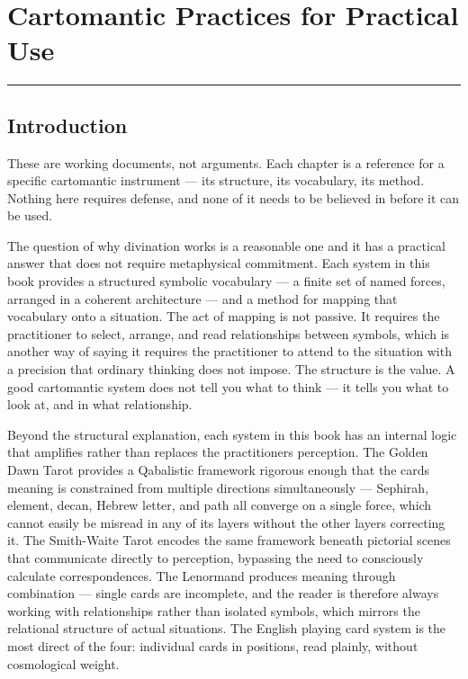 \chapter{Cartomantic Practices for Practical Use}\label{cartomantic-practices-for-practical-use}

\begin{center}\rule{0.5\linewidth}{0.5pt}\end{center}

\section{Introduction}\label{introduction}

These are working documents, not arguments. Each chapter is a reference for a specific cartomantic instrument --- its structure, its vocabulary, its method. Nothing here requires defense, and none of it needs to be believed in before it can be used.

The question of why divination works is a reasonable one and it has a practical answer that does not require metaphysical commitment. Each system in this book provides a structured symbolic vocabulary --- a finite set of named forces, arranged in a coherent architecture --- and a method for mapping that vocabulary onto a situation. The act of mapping is not passive. It requires the practitioner to select, arrange, and read relationships between symbols, which is another way of saying it requires the practitioner to attend to the situation with a precision that ordinary thinking does not impose. The structure is the value. A good cartomantic system does not tell you what to think --- it tells you what to look at, and in what relationship.

Beyond the structural explanation, each system in this book has an internal logic that amplifies rather than replaces the practitioner\textquotesingle s perception. The Golden Dawn Tarot provides a Qabalistic framework rigorous enough that the card\textquotesingle s meaning is constrained from multiple directions simultaneously --- Sephirah, element, decan, Hebrew letter, and path all converge on a single force, which cannot easily be misread in any of its layers without the other layers correcting it. The Smith-Waite Tarot encodes the same framework beneath pictorial scenes that communicate directly to perception, bypassing the need to consciously calculate correspondences. The Lenormand produces meaning through combination --- single cards are incomplete, and the reader is therefore always working with relationships rather than isolated symbols, which mirrors the relational structure of actual situations. The English playing card system is the most direct of the four: individual cards in positions, read plainly, without cosmological weight.

